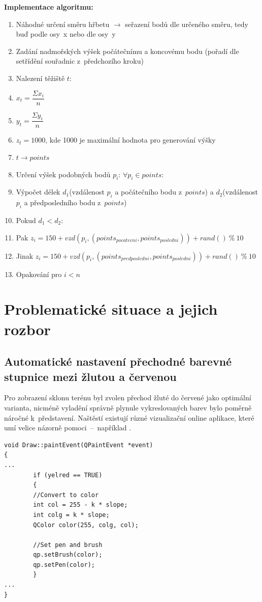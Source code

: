 \documentclass[a4paper, 12pt, oneside, titlepage]{article} %
\begin{document}
\textbf{Implementace algoritmu:}
\begin{enumerate}
\item Náhodné určení směru hřbetu $\rightarrow$ seřazení bodů dle určeného směru, tedy buď podle osy~x nebo dle osy~y
\item Zadání nadmořských výšek počátečnímu a koncovému bodu (pořadí dle setřídění souřadnic z~předchozího kroku)
\item Nalezení těžiště $t$:
\item \quad $x_t= \dfrac{\Sigma x_i}{n}$ 
\item \quad $y_t= \dfrac{\Sigma y_i}{n}$
\item \quad $z_t= 1000$, kde 1000 je maximální hodnota pro generování výšky
\item $t \rightarrow points$
\item Určení výšek podobných bodů $p_i$: $\forall p_i \in points $:
\item \quad Výpočet délek $d_1$(vzdálenost $p_i$ a počátečního bodu z~$points$) a $d_2$(vzdálenost $p_i$ a předposledního bodu z~$points$) 
\item \quad Pokud $d_1<d_2$:
\item \quad \quad Pak $z_i=150+vzd(p_i,(points_{pocatecni},points_{posledni}))+rand()~\%~10$
\item \quad \quad Jinak $z_i=150+vzd(p_i,(points_{predposledni},points_{posledni}))+rand()~\%~10$
\item Opakování pro $i<n$
\end{enumerate}

\section{Problematické situace a jejich rozbor} \label{problemrozbor}
\subsection{Automatické nastavení přechodné barevné stupnice mezi žlutou a červenou}
Pro zobrazení sklonu terénu byl zvolen přechod žluté do červené jako optimální varianta, nicméně vyladění správně plynule vykreslovaných barev bylo poměrně náročné k~představení. Naštěstí existují různé vizualizační online aplikace, které umí velice názorně pomoci~--~například \cite{rgbcol}.

\begin{verbatim}
void Draw::paintEvent(QPaintEvent *event)
{
...
        if (yelred == TRUE)
        {
        //Convert to color
        int col = 255 - k * slope;
        int colg = k * slope;
        QColor color(255, colg, col);

        //Set pen and brush
        qp.setBrush(color);
        qp.setPen(color);
        }
...
}
\end{verbatim}
\end{document}
